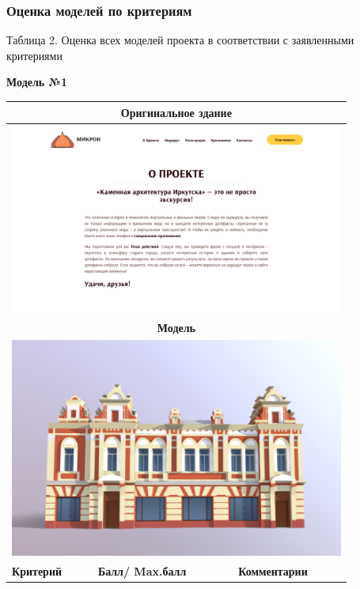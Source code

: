 \subsubsection*{Оценка моделей по критериям}

\begin{center}
    Таблица 2. Оценка всех моделей проекта в соответствии с заявленными критериями
\end{center}

\begin{center}
    \textbf{Модель №1}
\end{center}

\begin{longtable}{|p{4cm}|p{2.5cm}|p{7.5cm}|}
    \hline
    \multicolumn{3}{|c|}{\textbf{Оригинальное здание} } \\
    \hline
    \multicolumn{3}{|c|}{\includegraphics[width=11cm]{1}} \\
    \hline
    \multicolumn{3}{|c|}{\textbf{Модель}} \\
    \hline
    \multicolumn{3}{|c|}{\includegraphics[width=11cm]{src/model_1}} \\
    \hline
    \textbf{Критерий} & \textbf{Балл/ Max.балл} & \textbf{Комментарии} \\

\end{longtable}
